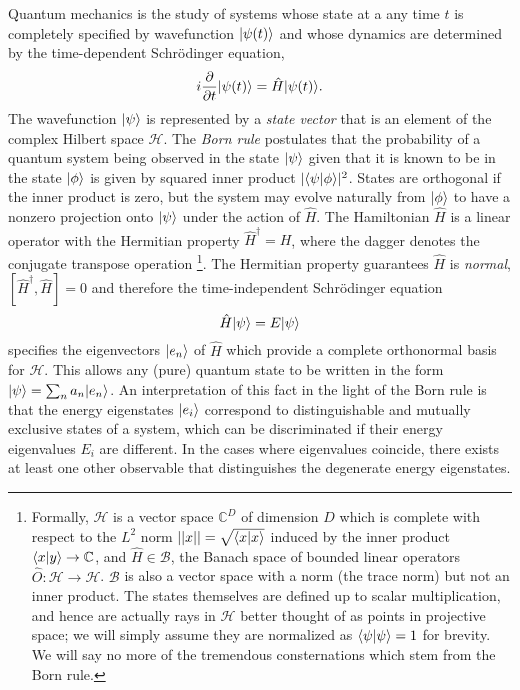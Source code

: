 	Quantum mechanics is the study of systems whose state at a any time $t$ is completely specified by wavefunction $|\psi(t)\rangle$ and whose dynamics are determined by the time-dependent Schr\"{o}dinger equation,
	\begin{equation}
		i\frac{\partial}{\partial t}|\psi(t)\rangle = \hat{H}|\psi(t)\rangle.
		\label{eqn:TDSE}
	\end{equation}
	The wavefunction $|\psi\rangle$ is represented by a \emph{state vector} that is an element of the complex Hilbert space $\mathcal{H}$.
	The \emph{Born rule} postulates that the probability of a quantum system being observed in the state $|\psi\rangle$ given that it is known to be in the state $|\phi\rangle$ is given by squared inner product $|\langle\psi|\phi\rangle|^2$.
	States are orthogonal if the inner product is zero, but the system may evolve naturally from $|\phi\rangle$ to have a nonzero projection onto $|\psi\rangle$ under the action of $\hat{H}$.
	The Hamiltonian $\hat{H}$ is a linear operator with the Hermitian property $\hat{H}^\dagger=H$, where the dagger denotes the conjugate transpose operation \footnote{Formally, $\mathcal{H}$ is a vector space $\mathbb{C}^D$ of dimension $D$ which is complete with respect to the $L^2$ norm $||x||=\sqrt{\langle x|x\rangle}$ induced by the inner product $\langle x|y\rangle\rightarrow\mathbb{C}$, and $\hat{H}\in\mathcal{B}$, the Banach space of bounded linear operators $\hat{O}:\mathcal{H}\rightarrow\mathcal{H}$.
	$\mathcal{B}$ is also a vector space with a norm (the trace norm) but not an inner product.
	The states themselves are defined up to scalar multiplication, and hence are actually rays in $\mathcal{H}$ better thought of as points in projective space; we will simply assume they are normalized as $\langle\psi|\psi\rangle=1$ for brevity.
	We will say no more of the tremendous consternations which stem from the Born rule.}.	The Hermitian property guarantees $\hat{H}$ is \emph{normal}, $[\hat{H}^\dagger, \hat{H}]=0$ and therefore the time-independent Schr\"{o}dinger equation
	\begin{equation}
		\hat{H}|\psi\rangle = E|\psi\rangle
		\label{eqn:TISE}
	\end{equation}
	specifies the eigenvectors $|e_n\rangle$ of $\hat{H}$ which provide a complete orthonormal basis for $\mathcal{H}$.
	This allows any (pure) quantum state to be written in the form $|\psi\rangle = \sum_n a_n|e_n\rangle$.
	An interpretation of this fact in the light of the Born rule is that the energy eigenstates $|e_i\rangle$ correspond to distinguishable  and mutually exclusive  states of a system, which can be discriminated if their energy eigenvalues $E_i$ are different.
	In the cases where eigenvalues coincide, there exists at least one other observable that distinguishes the degenerate energy eigenstates.

